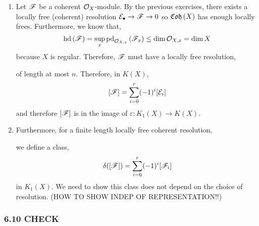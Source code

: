 \documentclass[12pt]{article}
\begin{document}
\begin{enumerate}
\item Let $\mathscr{F}$ be a coherent $\mathcal{O}_{X}$-module. By the previous exercises, there exists a locally free (coherent) resolution $\mathcal{E}_\bullet \to \mathscr{F} \to 0$ so $\mathfrak{Coh}\left(X\right)$ has enough locally frees. Furthermore, we know that,
\[ \mathrm{hd}\left( \mathscr{F} \right) = \sup_x \mathrm{pd}_{\mathcal{O}_{X, x}}\left(\mathscr{F}_x \right) \le \dim{\mathcal{O}_{X, x}} = \dim{X} \]
because $X$ is regular. Therefore, $\mathscr{F}$ must have a locally free resolution,
\begin{center}
\end{center} 
of length at most $n$. Therefore, in $K(X)$,
\[ [\mathscr{F}] = \sum_{i = 0}^r (-1)^i [\mathcal{E}_i] \]
and therefore $[\mathscr{F}]$ is in the image of $\varepsilon : K_1(X) \to K(X)$.

\item Furthermore, for a finite length locally free coherent resolution,
\begin{center}
\end{center} 
we define a class,
\[ \delta([\mathscr{F}]) = \sum_{i = 0}^{r} (-1)^i [\mathscr{F}_i] \]
in $K_1(X)$. We need to show this class does not depend on the choice of resolution. (HOW TO SHOW INDEP OF REPRESENTATION!!)
\end{enumerate}

\subsubsection{6.10 CHECK}
\end{document}
